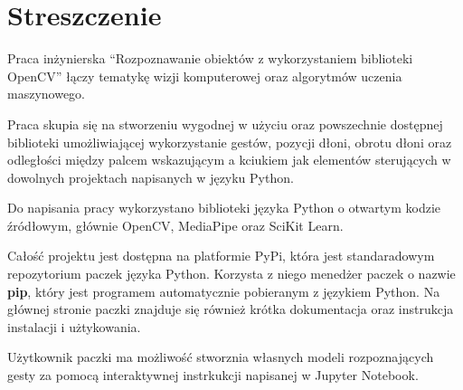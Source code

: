 \chapter{Streszczenie}



\quad Praca inżynierska \enquote{Rozpoznawanie obiektów z wykorzystaniem biblioteki OpenCV} łączy tematykę wizji komputerowej oraz algorytmów uczenia maszynowego. 

\quad Praca skupia się na stworzeniu wygodnej w użyciu oraz powszechnie dostępnej biblioteki umożliwiającej wykorzystanie gestów, pozycji dłoni, obrotu dłoni oraz odległości między palcem wskazującym a kciukiem jak elementów sterujących w dowolnych projektach napisanych w języku Python. 

\quad Do napisania pracy wykorzystano biblioteki języka Python o otwartym kodzie źródłowym, głównie OpenCV, MediaPipe oraz SciKit Learn. 

\quad Całość projektu jest dostępna na platformie PyPi, która jest standaradowym repozytorium paczek języka Python. Korzysta z niego menedżer paczek o nazwie \textbf{pip}, który jest programem automatycznie pobieranym z językiem Python. Na głównej stronie paczki znajduje się również krótka dokumentacja oraz instrukcja instalacji i użtykowania. 

\quad Użytkownik paczki ma możliwość stworznia własnych modeli rozpoznających gesty za pomocą interaktywnej instrkukcji napisanej w Jupyter Notebook. 



\pagestyle{NumeryStronNazwyRozdzialow}